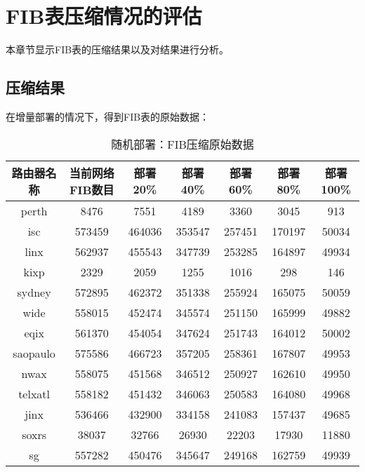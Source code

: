 \section{FIB表压缩情况的评估}
本章节显示FIB表的压缩结果以及对结果进行分析。
\subsection{压缩结果}
在增量部署的情况下，得到FIB表的原始数据：

\begin{table}[h]
    \centering
    \caption{随机部署：FIB压缩原始数据}
    \label{tab:origindata}
        \begin{tabular}{|c|c|c|c|c|c|c|}
            \hline
            路由器名称 & 当前网络FIB数目 & 部署20\% &部署40\% &部署60\% &部署80\% &部署100\% \\ \hline
            perth    & 8476   & 7551   & 4189   & 3360   & 3045   & 913     \\ \hline
            isc      & 573459 & 464036 & 353547 & 257451 & 170197 & 50034    \\ \hline
            linx     & 562937 & 455543 & 347739 & 253285 & 164897 & 49934     \\ \hline
            kixp     & 2329   & 2059   & 1255   & 1016   & 298    & 146        \\ \hline
            sydney   & 572895 & 462372 & 351338 & 255924 & 165075 & 50059       \\ \hline
            wide     & 558015 & 452474 & 345574 & 251150 & 165999 & 49882        \\ \hline
            eqix     & 561370 & 454054 & 347624 & 251743 & 164012 & 50002         \\ \hline
            saopaulo & 575586 & 466723 & 357205 & 258361 & 167807 & 49953          \\ \hline
            nwax     & 558075 & 451568 & 346512 & 250927 & 162610 & 49950           \\ \hline
            telxatl  & 558182 & 451432 & 346063 & 250583 & 164080 & 49968            \\ \hline
            jinx     & 536466 & 432900 & 334158 & 241083 & 157437 & 49685             \\ \hline
            soxrs    & 38037  & 32766  & 26930  & 22203  & 17930  & 11880              \\ \hline
            sg       & 557282 & 450476 & 345647 & 249168 & 162759 & 49939               \\ \hline
        \end{tabular}
\end{table}

